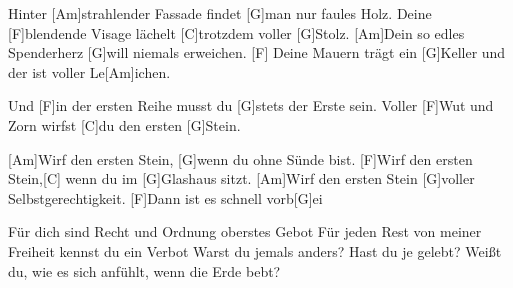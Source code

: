 

\begin{guitar}
	Hinter [Am]strahlender Fassade findet [G]man nur faules Holz.
	Deine [F]blendende Visage lächelt [C]trotzdem voller [G]Stolz.
	[Am]Dein so edles Spenderherz [G]will niemals erweichen.
	[F] Deine Mauern trägt ein [G]Keller und der ist voller Le[Am]ichen.
	
	Und [F]in der ersten Reihe musst du [G]stets der Erste sein.
	Voller [F]Wut und Zorn wirfst [C]du den ersten [G]Stein.
	
	[Am]Wirf den ersten Stein, [G]wenn du ohne Sünde bist.
	[F]Wirf den ersten Stein,[C] wenn du im [G]Glashaus sitzt.
	[Am]Wirf den ersten Stein [G]voller Selbstgerechtigkeit.
	[F]Dann ist es schnell vorb[G]ei
	
	Für dich sind Recht und Ordnung oberstes Gebot
	Für jeden Rest von meiner Freiheit kennst du ein Verbot
	Warst du jemals anders? Hast du je gelebt?
	Weißt du, wie es sich anfühlt, wenn die Erde bebt?
	
	 

	 
	

	 
	
	 
\end{guitar}